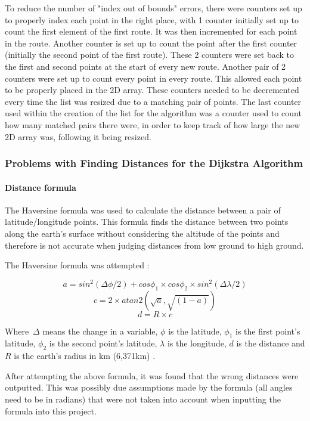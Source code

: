 \documentclass[12pt,a4paper]{article}
\begin{document}
To reduce the number of "index out of bounds" errors, there were counters set up to properly index each point in the right place, with 1 counter initially set up to count the first element of the first route. It was then incremented for each point in the route. Another counter is set up to count the point after the first counter (initially the second point of the first route). These 2 counters were set back to the first and second points at the start of every new route. Another pair of 2 counters were set up to count every point in every route. This allowed each point to be properly placed in the 2D array. These counters needed to be decremented every time the list was resized due to a matching pair of points. The last counter used within the creation of the list for the algorithm was a counter used to count how many matched pairs there were, in order to keep track of how large the new 2D array was, following it being resized.

\subsubsection{Problems with Finding Distances for the Dijkstra Algorithm}

\paragraph{Distance formula}
The Haversine formula was used to calculate the distance between a pair of latitude/longitude points. This formula finds the distance between two points along the earth's surface without considering the altitude of the points and therefore is not accurate when judging distances from low ground to high ground. 

The Haversine formula was attempted \cite{Haversine}: 

\[
a= sin^2(\Delta\phi/2) + cos\phi_1 \times cos\phi_2 \times sin^2(\Delta\lambda/2)
\]
\[
c=2 \times atan2(\sqrt{a},\sqrt{(1-a)})
\]
\[
d= R \times c
\]

Where~$\Delta$ means the change in a variable, $\phi$ is the latitude, $\phi_1$ is the first point's latitude, $\phi_2$ is the second point's latitude, $\lambda$ is the longitude, $d$ is the distance and $R$ is the earth's radius in km (6,371km) \cite{Haversine}.

After attempting the above formula, it was found that the wrong distances were outputted. This was possibly due assumptions made by the formula (all angles need to be in radians) that were not taken into account when inputting the formula into this project.
\end{document}
